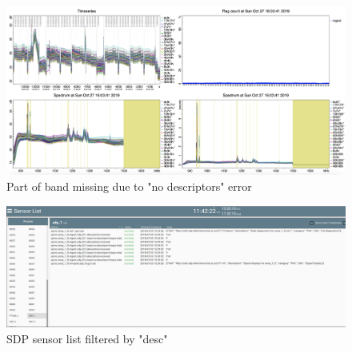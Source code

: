 \begin{figure}[!thb]
	\centering
	\includegraphics[scale=0.2]{Chapters/images/image65.png}
	
	\caption{Part of band missing due to "no descriptors" error}
	\label{fig:image65}
\end{figure}

\begin{figure}[!thb]
	\centering
	\includegraphics[scale=0.25]{Chapters/images/image129.png}
	
	\caption{SDP sensor list filtered by "desc"}
	\label{fig:image129}
\end{figure}

